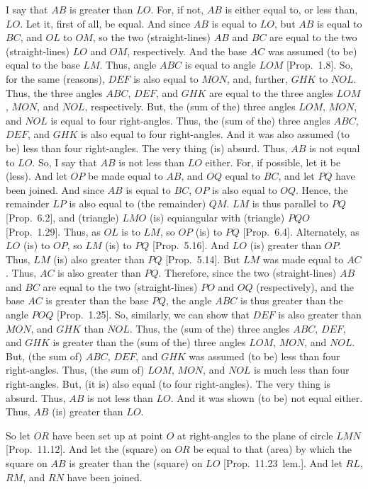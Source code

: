  I say that $AB$ is greater
than $LO$. For, if not, $AB$ is either equal to, or less than, $LO$.
Let it, first of all, be equal. And since $AB$ is equal to $LO$, but $AB$
is equal to $BC$, and $OL$ to $OM$, so the two (straight-lines)
$AB$ and $BC$ are equal to the two (straight-lines) $LO$ and $OM$, respectively. And the base $AC$ was assumed (to be) equal to the base
$LM$. Thus, angle $ABC$ is equal to angle $LOM$ [Prop.~1.8]. So, for the same (reasons), $DEF$ is also equal to $MON$,
and, further, $GHK$ to $NOL$. Thus, the three angles $ABC$, $DEF$,
and $GHK$ are equal to the three angles $LOM$, $MON$, and $NOL$,
respectively. But, the (sum of the) three angles $LOM$, $MON$,
and $NOL$ is equal to four right-angles. 
Thus, the (sum of the) three angles $ABC$, $DEF$, and $GHK$ is
also equal to four right-angles.
And it was also assumed (to be)
less than four right-angles. The very thing (is) absurd. Thus, $AB$
is not equal to $LO$. So, I say that $AB$ is not less than $LO$ either.
For, if possible, let it be (less). And let $OP$ be made equal to $AB$, and
$OQ$ equal to $BC$, and let $PQ$ have been joined. And since $AB$ is equal
to $BC$, $OP$ is also equal to $OQ$. Hence, the remainder $LP$ is also
equal to (the remainder) $QM$. $LM$ is thus parallel to $PQ$ [Prop.~6.2], and (triangle) $LMO$ (is) equiangular with (triangle) $PQO$
[Prop.~1.29]. 
Thus, as $OL$ is to $LM$, so $OP$ (is) to $PQ$ [Prop.~6.4]. Alternately, as $LO$ (is) to $OP$, so $LM$ (is) to $PQ$
[Prop.~5.16]. And $LO$ (is) greater than $OP$. 
Thus, $LM$ (is) also greater than $PQ$ [Prop.~5.14]. 
But $LM$ was made equal to $AC$. Thus, $AC$ is also greater than $PQ$. Therefore, since the two
(straight-lines) $AB$ and $BC$ are equal
to the two (straight-lines) $PO$ and $OQ$ (respectively), and the base $AC$ is greater
than the base $PQ$, the angle $ABC$ is thus greater than the
angle $POQ$ [Prop.~1.25]. So, similarly,
we can show that $DEF$ is also greater than $MON$, and $GHK$ than
$NOL$. Thus, the (sum of the) three angles $ABC$, $DEF$, and
$GHK$ is greater than the (sum of the) three angles $LOM$, $MON$, and
$NOL$. But, (the sum of) $ABC$, $DEF$, and $GHK$ was assumed (to be)
less than four right-angles. Thus, (the sum of) $LOM$, $MON$, and
$NOL$ is much less than four right-angles. But, (it is) also equal (to four right-angles). The very thing is absurd. Thus, $AB$ is not less than $LO$.
And it was shown (to be) not equal either. Thus, $AB$ (is) greater  than
$LO$.

So let $OR$ have been set up at point $O$ at right-angles to the plane
of circle $LMN$ [Prop.~11.12]. And let the (square) on $OR$ be equal to that (area) by which the square on $AB$ is greater than the
(square) on $LO$ [Prop.~11.23~lem.]. And let $RL$, $RM$, and $RN$ have been joined.

